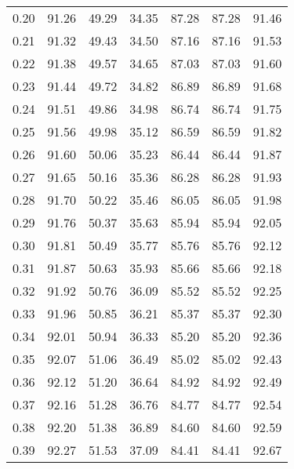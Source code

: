 \begin{tabular}{|c|c|c|c|c|c|c|}
      0.20 &     91.26 &     49.29 &      34.35 &   87.28 &      87.28 &         91.46 \\
      0.21 &     91.32 &     49.43 &      34.50 &   87.16 &      87.16 &         91.53 \\
      0.22 &     91.38 &     49.57 &      34.65 &   87.03 &      87.03 &         91.60 \\
      0.23 &     91.44 &     49.72 &      34.82 &   86.89 &      86.89 &         91.68 \\
      0.24 &     91.51 &     49.86 &      34.98 &   86.74 &      86.74 &         91.75 \\
      0.25 &     91.56 &     49.98 &      35.12 &   86.59 &      86.59 &         91.82 \\
      0.26 &     91.60 &     50.06 &      35.23 &   86.44 &      86.44 &         91.87 \\
      0.27 &     91.65 &     50.16 &      35.36 &   86.28 &      86.28 &         91.93 \\
      0.28 &     91.70 &     50.22 &      35.46 &   86.05 &      86.05 &         91.98 \\
      0.29 &     91.76 &     50.37 &      35.63 &   85.94 &      85.94 &         92.05 \\
      0.30 &     91.81 &     50.49 &      35.77 &   85.76 &      85.76 &         92.12 \\
      0.31 &     91.87 &     50.63 &      35.93 &   85.66 &      85.66 &         92.18 \\
      0.32 &     91.92 &     50.76 &      36.09 &   85.52 &      85.52 &         92.25 \\
      0.33 &     91.96 &     50.85 &      36.21 &   85.37 &      85.37 &         92.30 \\
      0.34 &     92.01 &     50.94 &      36.33 &   85.20 &      85.20 &         92.36 \\
      0.35 &     92.07 &     51.06 &      36.49 &   85.02 &      85.02 &         92.43 \\
      0.36 &     92.12 &     51.20 &      36.64 &   84.92 &      84.92 &         92.49 \\
      0.37 &     92.16 &     51.28 &      36.76 &   84.77 &      84.77 &         92.54 \\
      0.38 &     92.20 &     51.38 &      36.89 &   84.60 &      84.60 &         92.59 \\
      0.39 &     92.27 &     51.53 &      37.09 &   84.41 &      84.41 &         92.67 \\

\end{tabular}
